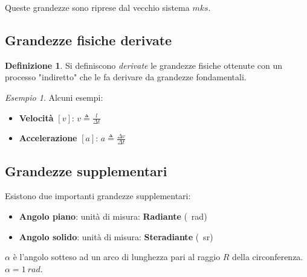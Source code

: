 \documentclass[a4paper, 12pt]{report}
\theoremstyle{definition}
\newtheorem{definition}{Definizione}[chapter]
\theoremstyle{remark}
\newtheorem{example}{Esempio}[definition]
\theoremstyle{plain}
\begin{document}
Queste grandezze sono riprese dal vecchio sistema $mks$.

\subsection{Grandezze fisiche derivate}

\begin{definition}
    Si definiscono {\it derivate} le grandezze fisiche ottenute con un processo "indiretto" che le fa derivare da grandezze fondamentali.
\end{definition}

\begin{example}
    Alcuni esempi:
    \begin{itemize}
        \item {\bf Velocità} $[v]$: $v \triangleq \frac{l}{\Delta t}$
        \item {\bf Accelerazione} $[a]$: $a \triangleq \frac{\Delta v}{\Delta t}$
    \end{itemize}
\end{example}

\subsection{Grandezze supplementari}

Esistono due importanti grandezze supplementari:
\begin{itemize}
    \item {\bf Angolo piano}: unità di misura: {\bf Radiante} (\SI{}{rad})
    \item {\bf Angolo solido}: unità di misura: {\bf Steradiante} (\SI{}{sr})
\end{itemize}

\begin{center}
\end{center}

$\alpha$ è l'angolo sotteso ad un arco di lunghezza pari al raggio $R$ della circonferenza. $\alpha = \SI{1}{rad}$.
\end{document}
